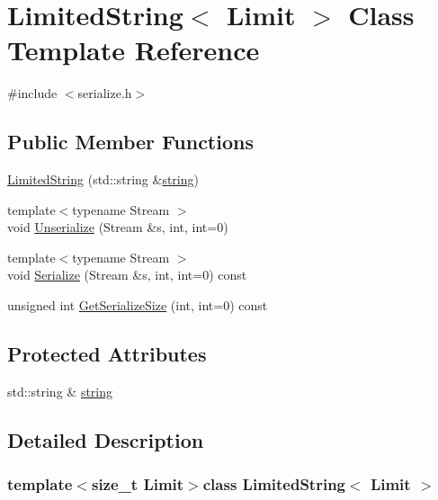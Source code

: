 \hypertarget{class_limited_string}{}\section{Limited\+String$<$ Limit $>$ Class Template Reference}
\label{class_limited_string}


{\ttfamily \#include $<$serialize.\+h$>$}

\subsection*{Public Member Functions}
\begin{DoxyCompactItemize}
\item 
\hyperlink{class_limited_string_afd9b0daa877f4d28c6b909bd34fd597d}{Limited\+String} (std\+::string \&\hyperlink{class_limited_string_a3f1d004f4632f7b2fda1a5a5afc266f7}{string})
\item 
{\footnotesize template$<$typename Stream $>$ }\\void \hyperlink{class_limited_string_a21ec9b742da8f8ff7b9a8b89131f943b}{Unserialize} (Stream \&s, int, int=0)
\item 
{\footnotesize template$<$typename Stream $>$ }\\void \hyperlink{class_limited_string_a4421821da094900bf15f79768a13e8b9}{Serialize} (Stream \&s, int, int=0) const 
\item 
unsigned int \hyperlink{class_limited_string_a9864565cf21b4f2ca09f78acc77d9563}{Get\+Serialize\+Size} (int, int=0) const 
\end{DoxyCompactItemize}
\subsection*{Protected Attributes}
\begin{DoxyCompactItemize}
\item 
std\+::string \& \hyperlink{class_limited_string_a3f1d004f4632f7b2fda1a5a5afc266f7}{string}
\end{DoxyCompactItemize}


\subsection{Detailed Description}
\subsubsection*{template$<$size\+\_\+t Limit$>$class Limited\+String$<$ Limit $>$}



